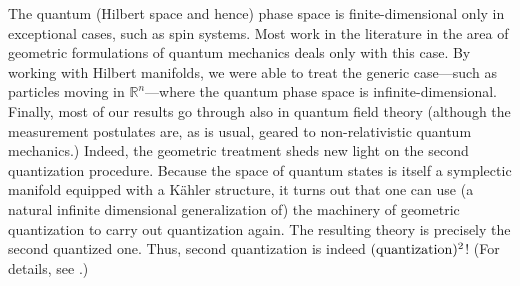 \documentclass[12pt,aps,eqsecnum,tighten,nofootinbib]{revtex4-2}
\def\R{\mathbb R}
\begin{document}
The quantum (Hilbert space and hence) phase space is
finite-dimensional only in exceptional cases, such as spin
systems. Most work in the literature in the area of geometric
formulations of quantum mechanics deals only with this case.  By
working with Hilbert manifolds, we were able to treat the generic
case---such as particles moving in $\R^n$---where the quantum phase
space is infinite-dimensional. Finally, most of our results go through
also in quantum field theory (although the measurement postulates are,
as is usual, geared to non-relativistic quantum mechanics.) Indeed,
the geometric treatment sheds new light on the second quantization
procedure. Because the space of quantum states is itself a symplectic
manifold equipped with a K\"ahler structure, it turns out that one can
use (a natural infinite dimensional generalization of) the machinery
of geometric quantization to carry out quantization again. The
resulting theory is precisely the second quantized one. Thus, second
quantization is indeed $({\rm quantization})^2$!  (For details, see
\cite{thesis}.)
\end{document}
